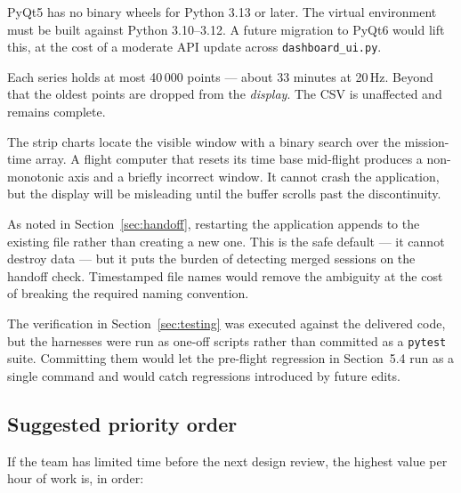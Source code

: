 \documentclass[11pt,a4paper]{article}
\newcommand{\file}[1]{\texttt{#1}}
\newcommand{\code}[1]{\texttt{#1}}
\begin{document}
\begin{description}[leftmargin=0mm,labelwidth=0mm,labelsep=0mm,style=nextline,font=\normalfont\bfseries]

\item[Python version constraint.] PyQt5 has no binary wheels for Python 3.13
or later. The virtual environment must be built against Python 3.10--3.12. A
future migration to PyQt6 would lift this, at the cost of a moderate API
update across \file{dashboard\_ui.py}.

\item[Plot history is bounded.] Each series holds at most 40\,000 points ---
about 33 minutes at 20\,Hz. Beyond that the oldest points are dropped from
the \emph{display}. The CSV is unaffected and remains complete.

\item[Mission-time $x$-axis assumes monotonicity.] The strip charts locate the
visible window with a binary search over the mission-time array. A flight
computer that resets its time base mid-flight produces a non-monotonic axis
and a briefly incorrect window. It cannot crash the application, but the
display will be misleading until the buffer scrolls past the discontinuity.

\item[Append-mode CSV can merge sessions.] As noted in
Section~\ref{sec:handoff}, restarting the application appends to the existing
file rather than creating a new one. This is the safe default --- it cannot
destroy data --- but it puts the burden of detecting merged sessions on the
handoff check. Timestamped file names would remove the ambiguity at the cost
of breaking the required naming convention.

\item[No automated test suite in the repository.] The verification in
Section~\ref{sec:testing} was executed against the delivered code, but the
harnesses were run as one-off scripts rather than committed as a \code{pytest}
suite. Committing them would let the pre-flight regression in
Section~5.4 run as a single command and would catch
regressions introduced by future edits.

\end{description}

\subsection{Suggested priority order}

If the team has limited time before the next design review, the highest
value per hour of work is, in order:
\end{document}
